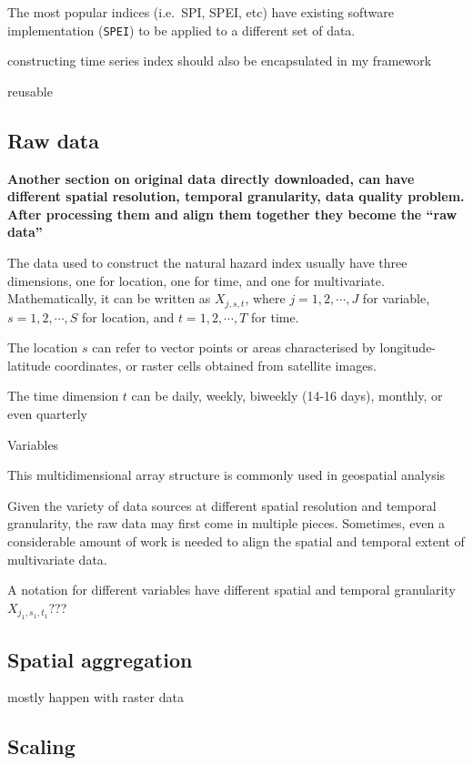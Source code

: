 \documentclass[
]{article}
\begin{document}
The most popular indices (i.e.~SPI, SPEI, etc) have existing software
implementation (\texttt{SPEI}) to be applied to a different set of data.

constructing time series index should also be encapsulated in my
framework

reusable

\hypertarget{raw-data}{%
\subsection{Raw data}\label{raw-data}}

\textbf{Another section on original data directly downloaded, can have
different spatial resolution, temporal granularity, data quality
problem. After processing them and align them together they become the
``raw data''}

The data used to construct the natural hazard index usually have three
dimensions, one for location, one for time, and one for multivariate.
Mathematically, it can be written as \(X_{j, s, t}\), where
\(j = 1, 2, \cdots, J\) for variable, \(s = 1, 2, \cdots, S\) for
location, and \(t = 1, 2, \cdots, T\) for time.

The location \(s\) can refer to vector points or areas characterised by
longitude-latitude coordinates, or raster cells obtained from satellite
images.

The time dimension \(t\) can be daily, weekly, biweekly (14-16 days),
monthly, or even quarterly

Variables

This multidimensional array structure is commonly used in geospatial
analysis

Given the variety of data sources at different spatial resolution and
temporal granularity, the raw data may first come in multiple pieces.
Sometimes, even a considerable amount of work is needed to align the
spatial and temporal extent of multivariate data.

A notation for different variables have different spatial and temporal
granularity \(X_{j_1, s_1, t_1}\)???

\hypertarget{spatial-aggregation}{%
\subsection{Spatial aggregation}\label{spatial-aggregation}}

mostly happen with raster data

\hypertarget{scaling}{%
\subsection{Scaling}\label{scaling}}
\end{document}
